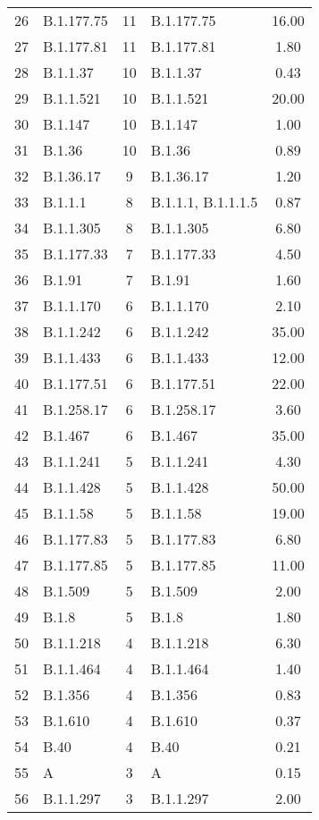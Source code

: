 \begin{longtable}{llcp{4cm}c}
  26 & B.1.177.75 &  11 & B.1.177.75 & 16.00 \\ 
  27 & B.1.177.81 &  11 & B.1.177.81 & 1.80 \\ 
  28 & B.1.1.37 &  10 & B.1.1.37 & 0.43 \\ 
  29 & B.1.1.521 &  10 & B.1.1.521 & 20.00 \\ 
  30 & B.1.147 &  10 & B.1.147 & 1.00 \\ 
  31 & B.1.36 &  10 & B.1.36 & 0.89 \\ 
  32 & B.1.36.17 &   9 & B.1.36.17 & 1.20 \\ 
  33 & B.1.1.1 &   8 & B.1.1.1, B.1.1.1.5 & 0.87 \\ 
  34 & B.1.1.305 &   8 & B.1.1.305 & 6.80 \\ 
  35 & B.1.177.33 &   7 & B.1.177.33 & 4.50 \\ 
  36 & B.1.91 &   7 & B.1.91 & 1.60 \\ 
  37 & B.1.1.170 &   6 & B.1.1.170 & 2.10 \\ 
  38 & B.1.1.242 &   6 & B.1.1.242 & 35.00 \\ 
  39 & B.1.1.433 &   6 & B.1.1.433 & 12.00 \\ 
  40 & B.1.177.51 &   6 & B.1.177.51 & 22.00 \\ 
  41 & B.1.258.17 &   6 & B.1.258.17 & 3.60 \\ 
  42 & B.1.467 &   6 & B.1.467 & 35.00 \\ 
  43 & B.1.1.241 &   5 & B.1.1.241 & 4.30 \\ 
  44 & B.1.1.428 &   5 & B.1.1.428 & 50.00 \\ 
  45 & B.1.1.58 &   5 & B.1.1.58 & 19.00 \\ 
  46 & B.1.177.83 &   5 & B.1.177.83 & 6.80 \\ 
  47 & B.1.177.85 &   5 & B.1.177.85 & 11.00 \\ 
  48 & B.1.509 &   5 & B.1.509 & 2.00 \\ 
  49 & B.1.8 &   5 & B.1.8 & 1.80 \\ 
  50 & B.1.1.218 &   4 & B.1.1.218 & 6.30 \\ 
  51 & B.1.1.464 &   4 & B.1.1.464 & 1.40 \\ 
  52 & B.1.356 &   4 & B.1.356 & 0.83 \\ 
  53 & B.1.610 &   4 & B.1.610 & 0.37 \\ 
  54 & B.40 &   4 & B.40 & 0.21 \\ 
  55 & A &   3 & A & 0.15 \\ 
  56 & B.1.1.297 &   3 & B.1.1.297 & 2.00 \\ 

\end{longtable}
